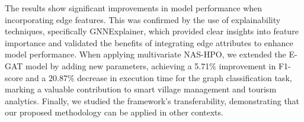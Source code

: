 \documentclass[journal]{IEEEtran}
\begin{document}
The results show significant improvements in model performance when incorporating edge features. This was confirmed by the use of explainability techniques, specifically GNNExplainer, which provided clear insights into feature importance and validated the benefits of integrating edge attributes to enhance model performance. When applying multivariate NAS-HPO, we extended the E-GAT model by adding new parameters, achieving a 5.71\% improvement in F1-score and a 20.87\% decrease in execution time for the graph classification task, marking a valuable contribution to smart village management and tourism analytics. Finally, we studied the framework’s transferability, demonstrating that our proposed methodology can be applied in other contexts.




%



\end{document}
